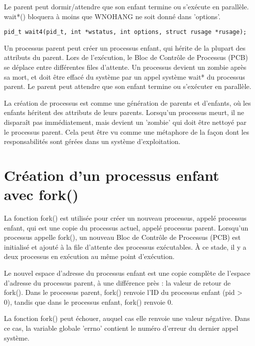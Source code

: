 \documentclass[12pt]{report}
\begin{document}
Le parent peut dormir/attendre que son enfant termine ou s'exécute en parallèle. wait*() bloquera à moins que WNOHANG ne soit donné dans 'options'.
\begin{lstlisting}
pid_t wait4(pid_t, int *wstatus, int options, struct rusage *rusage);
\end{lstlisting}
\begin{tcolorbox}[colback=yellow!5, colframe=yellow!80!black, title={\faBookmark À retenir}]
Un processus parent peut créer un processus enfant, qui hérite de la plupart des attributs du parent. Lors de l'exécution, le Bloc de Contrôle de Processus (PCB) se déplace entre différentes files d'attente. Un processus devient un zombie après sa mort, et doit être effacé du système par un appel système wait* du processus parent. Le parent peut attendre que son enfant termine ou s'exécuter en parallèle.
\end{tcolorbox}
\begin{tcolorbox}[colback=green!5, colframe=green!75!black, title={\faLightbulb Intuition}]
La création de processus est comme une génération de parents et d'enfants, où les enfants héritent des attributs de leurs parents. Lorsqu'un processus meurt, il ne disparaît pas immédiatement, mais devient un 'zombie' qui doit être nettoyé par le processus parent. Cela peut être vu comme une métaphore de la façon dont les responsabilités sont gérées dans un système d'exploitation.
\end{tcolorbox}

\section{Création d'un processus enfant avec fork()}

La fonction fork() est utilisée pour créer un nouveau processus, appelé processus enfant, qui est une copie du processus actuel, appelé processus parent. Lorsqu'un processus appelle fork(), un nouveau Bloc de Contrôle de Processus (PCB) est initialisé et ajouté à la file d'attente des processus exécutables. À ce stade, il y a deux processus en exécution au même point d'exécution.

Le nouvel espace d'adresse du processus enfant est une copie complète de l'espace d'adresse du processus parent, à une différence près : la valeur de retour de fork(). Dans le processus parent, fork() renvoie l'ID du processus enfant (pid > 0), tandis que dans le processus enfant, fork() renvoie 0.

La fonction fork() peut échouer, auquel cas elle renvoie une valeur négative. Dans ce cas, la variable globale 'errno' contient le numéro d'erreur du dernier appel système.
\end{document}
